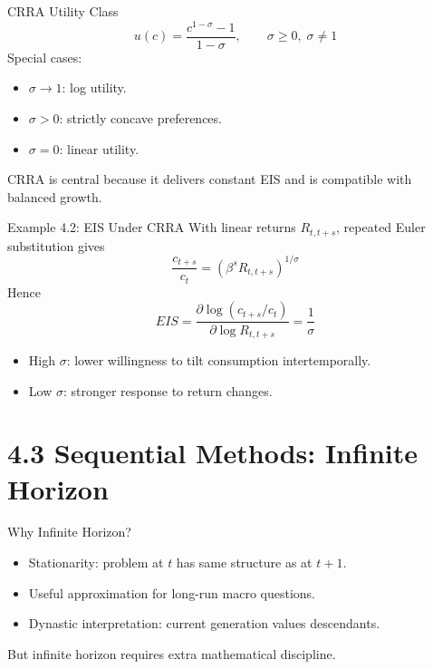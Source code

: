 \documentclass[aspectratio=169,10pt]{beamer}
\newcommand{\apxbutton}[1]{\hfill\hyperlink{#1}{\beamerbutton{Appendix}}}
\begin{document}
\begin{frame}{CRRA Utility Class}
\[
u(c)=\frac{c^{1-\sigma}-1}{1-\sigma},\qquad \sigma\ge 0,\;\sigma\ne 1
\]
Special cases:
\begin{itemize}
  \item $\sigma\to 1$: log utility.
  \item $\sigma>0$: strictly concave preferences.
  \item $\sigma=0$: linear utility.
\end{itemize}

CRRA is central because it delivers constant EIS and is compatible with balanced growth.
\end{frame}

\begin{frame}{Example 4.2: EIS Under CRRA}
\hypertarget{m-a4}{}
With linear returns $R_{t,t+s}$, repeated Euler substitution gives
\[
\frac{c_{t+s}}{c_t}=\left(\beta^sR_{t,t+s}\right)^{1/\sigma}
\]
Hence
\[
EIS=\frac{\partial\log(c_{t+s}/c_t)}{\partial\log R_{t,t+s}}=\frac{1}{\sigma}
\]

\begin{itemize}
  \item High $\sigma$: lower willingness to tilt consumption intertemporally.
  \item Low $\sigma$: stronger response to return changes.
\end{itemize}
\apxbutton{a4}
\end{frame}

\section{4.3 Sequential Methods: Infinite Horizon}

\begin{frame}{Why Infinite Horizon?}
\begin{itemize}
  \item Stationarity: problem at $t$ has same structure as at $t+1$.
  \item Useful approximation for long-run macro questions.
  \item Dynastic interpretation: current generation values descendants.
\end{itemize}

\medskip
But infinite horizon requires extra mathematical discipline.
\end{frame}
\end{document}
